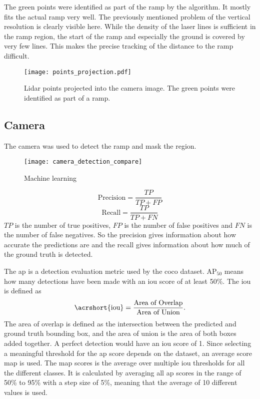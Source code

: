The green points were identified as part of the ramp by the algorithm.
It mostly fits the actual ramp very well.
The previously mentioned problem of the vertical resolution is clearly visible here.
While the density of the laser lines is sufficient in the ramp region, the start of the ramp and especially the ground is covered by very few lines.
This makes the precise tracking of the distance to the ramp difficult.
\begin{figure}[htbp]
	\centering
	\texttt{[image: points\_projection.pdf]}
	\caption{Lidar points projected into the camera image. The green points were identified as part of a ramp.}
	\label{fig:points_projection}
\end{figure}



\subsection{Camera}
The camera was used to detect the ramp and mask the region.
\begin{figure}[htbp]
	\centering
	\texttt{[image: camera\_detection\_compare]}
	\caption{Machine learning}
	\label{fig:camera_detection_compare}
\end{figure}
\begin{equation}
	\text{Precision} = \frac{TP}{TP+FP}
\end{equation}
\begin{equation}
	\text{Recall} = \frac{TP}{TP+FN}
\end{equation}
$TP$ is the number of true positives, $FP$ is the number of false positives and $FN$ is the number of false negatives.
So the precision gives information about how accurate the predictions are and the recall gives information about how much of the ground truth is detected.

The \gls{ap} is a detection evaluation metric used by the \gls{coco} dataset.
$\text{AP}_{50}$ means how many detections have been made with an \gls{iou} score of at least 50\%.
The \gls{iou} is defined as
\begin{equation}
	\text{\acrshort{iou}} = \frac{\text{Area of Overlap}}{\text{Area of Union}}.
\end{equation}
The area of overlap is defined as the intersection between the predicted and ground truth bounding box, and the area of union is the area of both boxes added together.
A perfect detection would have an \gls{iou} score of 1.
Since selecting a meaningful threshold for the \gls{ap} score depends on the dataset, an average score \gls{map} is used.
The \gls{map} scores is the average over multiple \gls{iou} thresholds for all the different classes.
It is calculated by averaging all \gls{ap} scores in the range of 50\% to 95\% with a step size of 5\%, meaning that the average of 10 different values is used.